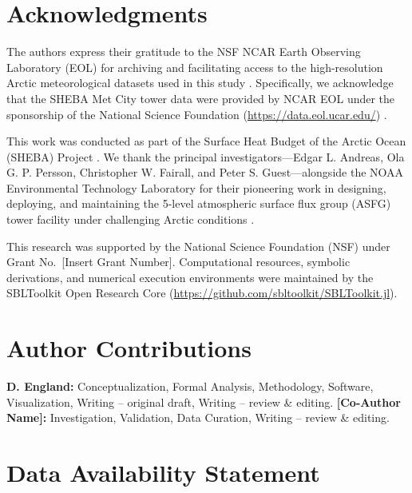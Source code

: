 \documentclass[draft,11pt]{article}
\theoremstyle{definition}
\theoremstyle{remark}
\begin{document}
\section*{Acknowledgments}

The authors express their gratitude to the NSF NCAR Earth Observing Laboratory (EOL) for archiving and facilitating access to the high-resolution Arctic meteorological datasets used in this study \cite{andreas2007}. Specifically, we acknowledge that the SHEBA Met City tower data were provided by NCAR EOL under the sponsorship of the National Science Foundation (\url{https://data.eol.ucar.edu/}) \cite{sheba2002}.

This work was conducted as part of the Surface Heat Budget of the Arctic Ocean (SHEBA) Project \cite{sheba2002}. We thank the principal investigators—Edgar L. Andreas, Ola G. P. Persson, Christopher W. Fairall, and Peter S. Guest—alongside the NOAA Environmental Technology Laboratory for their pioneering work in designing, deploying, and maintaining the 5-level atmospheric surface flux group (ASFG) tower facility under challenging Arctic conditions \cite{andreas2007}.

This research was supported by the National Science Foundation (NSF) under Grant No.~[Insert Grant Number]. Computational resources, symbolic derivations, and numerical execution environments were maintained by the SBLToolkit Open Research Core (\url{https://github.com/sbltoolkit/SBLToolkit.jl}).

\section*{Author Contributions}

\textbf{D. England:} Conceptualization, Formal Analysis, Methodology, Software, Visualization, Writing -- original draft, Writing -- review \& editing. \textbf{[Co-Author Name]:} Investigation, Validation, Data Curation, Writing -- review \& editing.

\section*{Data Availability Statement}
\end{document}
